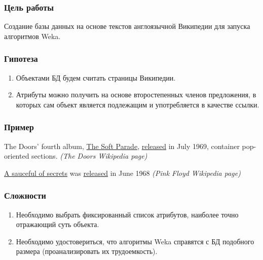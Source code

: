 \documentclass{beamer}
\begin{document}
\begin{frame}
\frametitle{Цель работы}
Создание базы данных на основе текстов англоязычной Википедии для запуска алгоритмов Weka.
\end{frame}
\begin{frame}
\frametitle{Гипотеза}
\begin{enumerate}
\item{Объектами БД будем считать страницы Википедии.}
   \item{Атрибуты можно получить на основе второстепенных членов предложения, в которых сам объект является подлежащим и употребляется в качестве ссылки.}
\end{enumerate}
\end{frame}
\begin{frame}
\frametitle{Пример}
The Doors' fourth album, \underline{The Soft Parade}, \underline{released} in July 1969, container pop-oriented sections. {\it (The Doors Wikipedia page)}\\

\vspace{1cm}

\underline{A sauceful of secrets} was \underline{released} in June 1968 {\it(Pink Floyd Wikipedia page)}

\end{frame}
\begin{frame}
\frametitle{Сложности}
\begin{enumerate}
\item{Необходимо выбрать фиксированный список атрибутов, наиболее точно отражающий суть объекта.}
\item{Необходимо удостовериться, что алгоритмы Weka справятся с БД подобного размера (проанализировать их трудоемкость).}
\end{enumerate}
\end{frame}
\end{document}
